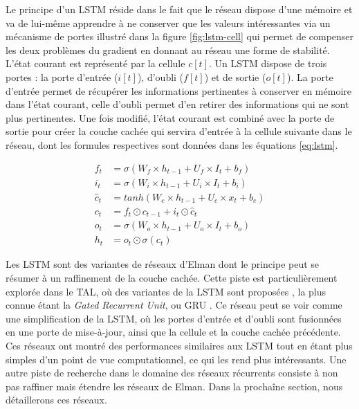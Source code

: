 \documentclass[12pt,a4paper,times,twoside,openright]{report}
\begin{document}
Le principe d'un LSTM réside dans le fait que le réseau dispose d'une mémoire et va de lui-même apprendre à ne conserver que les valeurs intéressantes via un mécanisme de portes illustré dans la figure \ref{fig:lstm-cell} qui permet de compenser les deux problèmes du gradient en donnant au réseau une forme de stabilité. L'état courant est représenté par la cellule $c[t]$. Un LSTM dispose de trois portes : la porte d'entrée ($i[t]$), d'oubli ($f[t]$) et de sortie ($o[t]$). La porte d'entrée permet de récupérer les informations pertinentes à conserver en mémoire dans l'état courant, celle d'oubli permet d'en retirer des informations qui ne sont plus pertinentes. Une fois modifié, l'état courant est combiné avec la porte de sortie pour créer la couche cachée qui servira d'entrée à la cellule suivante dans le réseau, dont les formules respectives sont données dans les équations \ref{eq:lstm}.

\begin{equation}\label{eq:lstm}
\begin{aligned}
f_{t}     &= \sigma(W_{f} \times h_{t-1} + U_{f} \times I_{t} + b_{f}) \\
i_{t}     &= \sigma(W_{i} \times h_{t-1} + U_{i} \times I_{t} + b_{i}) \\
\hat{c}_t &= tanh(W_{c} \times h_{t-1} + U_{c} \times x_{t} + b_c) \\
c_{t}     &= f_{t} \odot c_{t-1} + i_{t} \odot \hat{c}_{t} \\
o_{t}     &= \sigma(W_{o} \times h_{t-1} + U_{o} \times I_{t} + b_{o}) \\
h_{t}     &= o_{t} \odot \sigma(c_{t})
\end{aligned}
\end{equation}

Les LSTM sont des variantes de réseaux d'Elman dont le principe peut se résumer à un raffinement de la couche cachée. Cette piste est particulièrement explorée dans le TAL, où des variantes de la LSTM sont proposées \citep{chung2014empirical,greff2015lstm,zaremba2015empirical}, la plus connue étant la \emph{Gated Recurrent Unit}, ou GRU \citep{cho2014properties}. Ce réseau peut se voir comme une simplification de la LSTM, où les portes d'entrée et d'oubli sont fusionnées en une porte de mise-à-jour, ainsi que la cellule et la couche cachée précédente. Ces réseaux ont montré des performances similaires aux LSTM tout en étant plus simples d'un point de vue computationnel, ce qui les rend plus intéressants. Une autre piste de recherche dans le domaine des réseaux récurrents consiste à non pas raffiner mais étendre les réseaux de Elman. Dans la prochaîne section, nous détaillerons ces réseaux.
\end{document}

